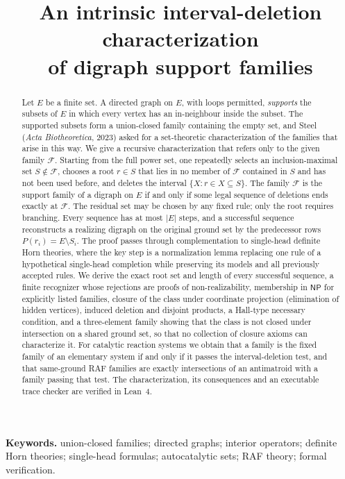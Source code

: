 \documentclass[11pt,a4paper]{article}
\title{An intrinsic interval-deletion characterization\\of digraph support families}
\author{\PaperAuthor}
\date{\PaperDate}
\theoremstyle{plain}
\theoremstyle{definition}
\theoremstyle{remark}
\newcommand{\cF}{\mathcal F}
\newcommand{\NP}{\mathsf{NP}}
\begin{document}
\maketitle

\begin{abstract}
Let $E$ be a finite set. A directed graph on $E$, with loops permitted, \emph{supports} the subsets of $E$ in which every vertex has an in-neighbour inside the subset. The supported subsets form a union-closed family containing the empty set, and Steel (\emph{Acta Biotheoretica}, 2023) asked for a set-theoretic characterization of the families that arise in this way. We give a recursive characterization that refers only to the given family $\cF$. Starting from the full power set, one repeatedly selects an inclusion-maximal set $S\notin\cF$, chooses a root $r\in S$ that lies in no member of $\cF$ contained in $S$ and has not been used before, and deletes the interval $\{X: r\in X\subseteq S\}$. The family $\cF$ is the support family of a digraph on $E$ if and only if some legal sequence of deletions ends exactly at $\cF$. The residual set may be chosen by any fixed rule; only the root requires branching. Every sequence has at most $|E|$ steps, and a successful sequence reconstructs a realizing digraph on the original ground set by the predecessor rows $P(r_i)=E\setminus S_i$. The proof passes through complementation to single-head definite Horn theories, where the key step is a normalization lemma replacing one rule of a hypothetical single-head completion while preserving its models and all previously accepted rules. We derive the exact root set and length of every successful sequence, a finite recognizer whose rejections are proofs of non-realizability, membership in $\NP$ for explicitly listed families, closure of the class under coordinate projection (elimination of hidden vertices), induced deletion and disjoint products, a Hall-type necessary condition, and a three-element family showing that the class is not closed under intersection on a shared ground set, so that no collection of closure axioms can characterize it. For catalytic reaction systems we obtain that a family is the fixed family of an elementary system if and only if it passes the interval-deletion test, and that same-ground RAF families are exactly intersections of an antimatroid with a family passing that test. The characterization, its consequences and an executable trace checker are verified in Lean~4.
\end{abstract}

\noindent\textbf{Keywords.} union-closed families; directed graphs; interior operators; definite Horn theories; single-head formulas; autocatalytic sets; RAF theory; formal verification.
\end{document}
